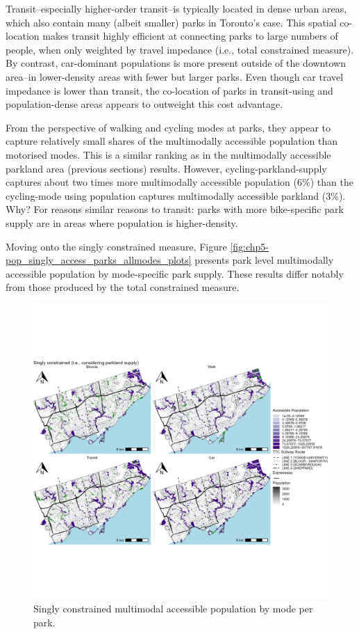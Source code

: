 \documentclass[
11pt, %
oneside, %
english, %
singlespacing, %
]{macthesis} %
\begin{document}
Transit--especially higher-order transit--is typically located in dense urban areas, which also contain many (albeit smaller) parks in Toronto's case. This spatial co-location makes transit highly efficient at connecting parks to large numbers of people, when only weighted by travel impedance (i.e., total constrained measure). By contrast, car-dominant populations is more present outside of the downtown area--in lower-density areas with fewer but larger parks. Even though car travel impedance is lower than transit, the co-location of parks in transit-using and population-dense areas appears to outweight this cost advantage.

From the perspective of walking and cycling modes at parks, they appear to capture relatively small shares of the multimodally accessible population than motorised modes. This is a similar ranking as in the multimodally accessible parkland area (previous sections) results. However, cycling-parkland-supply captures about two times more multimodally accessible population (6\%) than the cycling-mode using population captures multimodally accessible parkland (3\%). Why? For reasons similar reasons to transit: parks with more bike-specific park supply are in areas where population is higher-density.

Moving onto the singly constrained measure, Figure \ref{fig:chp5-pop_singly_access_parks_allmodes_plots} presents park level multimodally accessible population by mode-specific park supply. These results differ notably from those produced by the total constrained measure.

\begin{figure}

{\centering \includegraphics[width=6in]{./data/figures/chp5-pop_singly_access_parks_allmodes_plots} 

}

\caption{\label{fig:chp5-pop_singly_access_parks_allmodes_plots} Singly constrained multimodal accessible population by mode per park.}\label{fig:unnamed-chunk-88}
\end{figure}
\end{document}
